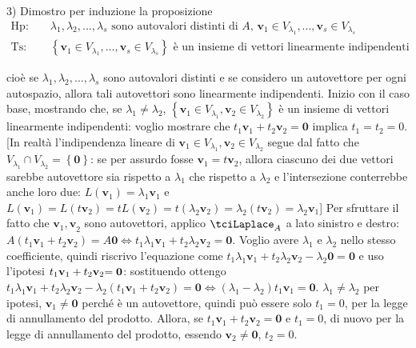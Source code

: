 \documentclass{article}
\begin{document}
3) Dimostro per induzione la proposizione 
\begin{eqnarray*}
\text{Hp}\text{: } &&\lambda _{1},\lambda _{2},...,\lambda _{s}\text{ sono
autovalori distinti di }A\text{, }\mathbf{v}_{1}\in V_{\lambda _{1}},...,%
\mathbf{v}_{s}\in V_{\lambda _{s}} \\
\text{Ts}\text{: } &&\left\{ \mathbf{v}_{1}\in V_{\lambda _{1}},...,\mathbf{v%
}_{s}\in V_{\lambda _{s}}\right\} \text{ \`{e} un insieme di vettori
linearmente indipendenti}
\end{eqnarray*}

cio\`{e} se $\lambda _{1},\lambda _{2},...,\lambda _{s}$ sono autovalori
distinti e se considero un autovettore per ogni autospazio, allora tali
autovettori sono linearmente indipendenti. Inizio con il caso base,
mostrando che, se $\lambda _{1}\neq \lambda _{2}$, $\left\{ \mathbf{v}%
_{1}\in V_{\lambda _{1}},\mathbf{v}_{2}\in V_{\lambda _{2}}\right\} $ \`{e}
un insieme di vettori linearmente indipendenti: voglio mostrare che $t_{1}%
\mathbf{v}_{1}+t_{2}\mathbf{v}_{2}\mathbf{=0}$ implica $t_{1}=t_{2}=0$. [In
realt\`{a} l'indipendenza lineare di $\mathbf{v}_{1}\in V_{\lambda _{1}},%
\mathbf{v}_{2}\in V_{\lambda _{2}}$ segue dal fatto che $V_{\lambda
_{1}}\cap V_{\lambda _{2}}=\left\{ \mathbf{0}\right\} $: se per assurdo
fosse $\mathbf{v}_{1}=t\mathbf{v}_{2}$, allora ciascuno dei due vettori
sarebbe autovettore sia rispetto a $\lambda _{1}$ che rispetto a $\lambda
_{2}$ e l'intersezione conterrebbe anche loro due: $L\left( \mathbf{v}%
_{1}\right) =\lambda _{1}\mathbf{v}_{1}$ e $L\left( \mathbf{v}_{1}\right)
=L\left( t\mathbf{v}_{2}\right) =tL\left( \mathbf{v}_{2}\right) =t\left(
\lambda _{2}\mathbf{v}_{2}\right) =\lambda _{2}\left( t\mathbf{v}_{2}\right)
=\lambda _{2}\mathbf{v}_{1}$] Per sfruttare il fatto che $\mathbf{v}_{1}%
\mathbf{,v}_{2}$ sono autovettori, applico $\tciLaplace _{A}$ a lato
sinistro e destro: $A\left( t_{1}\mathbf{v}_{1}+t_{2}\mathbf{v}_{2}\right) =A%
\mathbf{0}\Longleftrightarrow t_{1}\lambda _{1}\mathbf{v}_{1}+t_{2}\lambda
_{2}\mathbf{v}_{2}=\mathbf{0}$. Voglio avere $\lambda _{1}$ e $\lambda _{2}$
nello stesso coefficiente, quindi riscrivo l'equazione come $t_{1}\lambda
_{1}\mathbf{v}_{1}+t_{2}\lambda _{2}\mathbf{v}_{2}-\lambda _{2}\mathbf{0}=%
\mathbf{0}$ e uso l'ipotesi $t_{1}\mathbf{v}_{1}+t_{2}\mathbf{v}_{2}\mathbf{%
=0}$: sostituendo ottengo $t_{1}\lambda _{1}\mathbf{v}_{1}+t_{2}\lambda _{2}%
\mathbf{v}_{2}-\lambda _{2}\left( t_{1}\mathbf{v}_{1}+t_{2}\mathbf{v}%
_{2}\right) =\mathbf{0\Longleftrightarrow }\left( \lambda _{1}-\lambda
_{2}\right) t_{1}\mathbf{v}_{1}=\mathbf{0}$. $\lambda _{1}\neq \lambda _{2}$
per ipotesi, $\mathbf{v}_{1}\neq \mathbf{0}$ perch\'{e} \`{e} un
autovettore, quindi pu\`{o} essere solo $t_{1}=0$, per la legge di
annullamento del prodotto. Allora, se $t_{1}\mathbf{v}_{1}+t_{2}\mathbf{v}%
_{2}\mathbf{=0}$ e $t_{1}=0$, di nuovo per la legge di annullamento del
prodotto, essendo $\mathbf{v}_{2}\neq \mathbf{0}$, $t_{2}=0$.
\end{document}
